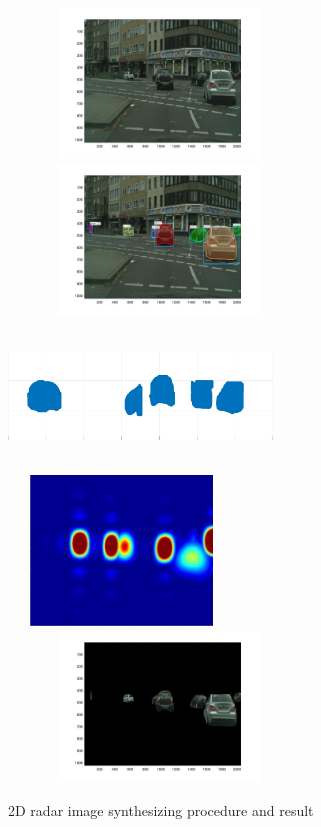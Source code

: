 \begin{figure}
	\centering
	\includegraphics[width=8cm,height=4cm]{./figure/2d_origin.jpg}\\
	\includegraphics[width=8cm,height=4cm]{./figure/2d_detect.jpg}\\
	\includegraphics[width=7cm,height=4cm]{./figure/3d_cam.jpg}\\
	\includegraphics[width=6cm,height=4cm]{./figure/2D_heatmap.jpg}\\
	\includegraphics[width=8cm,height=4cm]{./figure/2d_select.jpg}\\
	\caption{2D radar image synthesizing procedure and result}
	\label{2D_synth}
\end{figure}

